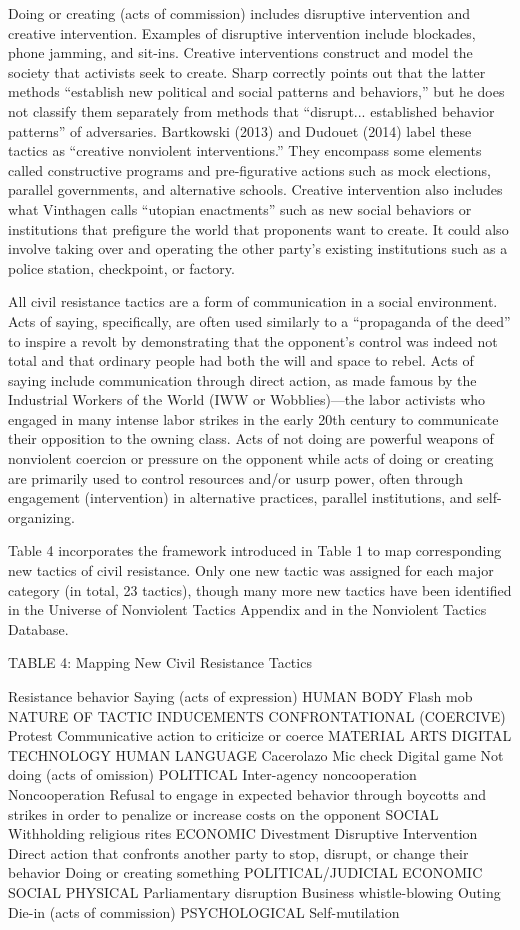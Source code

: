 \documentclass[twoside,a4paper,12pt,fleqn,openany]{extbook}
\begin{document}
Doing or creating (acts of commission) includes disruptive intervention and creative intervention. Examples of disruptive intervention include blockades, phone jamming, and sit-ins. Creative interventions construct and model the society that activists seek to create. Sharp correctly points out that the latter methods “establish new political and social patterns and behaviors,” but he does not classify them separately from methods that “disrupt... established behavior patterns” of adversaries. Bartkowski (2013) and Dudouet (2014) label these tactics as “creative nonviolent interventions.” They encompass some elements called constructive programs and pre-figurative actions such as mock elections, parallel governments, and alternative schools. Creative intervention also includes what Vinthagen calls “utopian enactments” such as new social behaviors or institutions that prefigure the world that proponents want to create. It could also involve taking over and operating the other party’s existing institutions such as a police station, checkpoint, or factory.

All civil resistance tactics are a form of communication in a social environment. Acts of saying, specifically, are often used similarly to a “propaganda of the deed” to inspire a revolt by demonstrating that the opponent’s control was indeed not total and that ordinary people had both the will and space to rebel. Acts of saying include communication through direct action, as made famous by the Industrial Workers of the World (IWW or Wobblies)—the labor activists who engaged in many intense labor strikes in the early 20th century to communicate their opposition to the owning class. Acts of not doing are powerful weapons of nonviolent coercion or pressure on the opponent while acts of doing or creating are primarily used to control resources and/or usurp power, often through engagement (intervention) in alternative practices, parallel institutions, and self-organizing.

Table 4 incorporates the framework introduced in Table 1 to map corresponding new tactics of civil resistance. Only one new tactic was assigned for each major category (in total, 23 tactics), though many more new tactics have been identified in the Universe of Nonviolent Tactics Appendix and in the Nonviolent Tactics Database.

TABLE 4: Mapping New Civil Resistance Tactics

Resistance behavior
Saying (acts of expression)
HUMAN BODY
Flash mob
NATURE OF TACTIC INDUCEMENTS
CONFRONTATIONAL (COERCIVE)
Protest
Communicative action to criticize or coerce
MATERIAL ARTS
DIGITAL TECHNOLOGY
HUMAN LANGUAGE
Cacerolazo
Mic check
Digital game
Not doing
(acts of omission)
POLITICAL
Inter-agency noncooperation
Noncooperation
Refusal to engage in expected behavior through boycotts and strikes in order to penalize or increase costs on the opponent
SOCIAL
Withholding religious rites
ECONOMIC
Divestment
Disruptive Intervention
Direct action that confronts another party to stop, disrupt, or change their behavior
Doing or creating something
POLITICAL/JUDICIAL
ECONOMIC
SOCIAL
PHYSICAL
Parliamentary disruption
Business whistle-blowing
Outing
Die-in
(acts of commission)
PSYCHOLOGICAL
Self-mutilation
\end{document}
